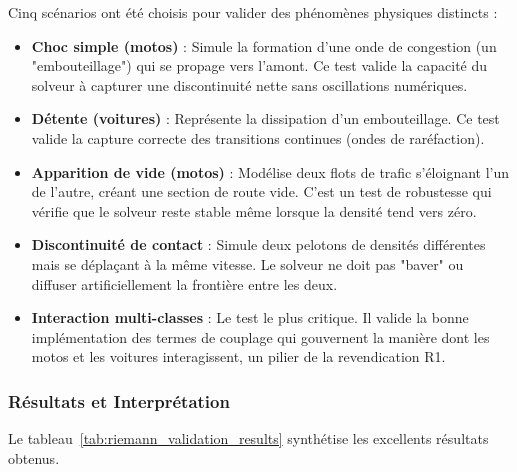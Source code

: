 Cinq scénarios ont été choisis pour valider des phénomènes physiques distincts :
\begin{itemize}
    \item \textbf{Choc simple (motos)} : Simule la formation d'une onde de congestion (un "embouteillage") qui se propage vers l'amont. Ce test valide la capacité du solveur à capturer une discontinuité nette sans oscillations numériques.
    \item \textbf{Détente (voitures)} : Représente la dissipation d'un embouteillage. Ce test valide la capture correcte des transitions continues (ondes de raréfaction).
    \item \textbf{Apparition de vide (motos)} : Modélise deux flots de trafic s'éloignant l'un de l'autre, créant une section de route vide. C'est un test de robustesse qui vérifie que le solveur reste stable même lorsque la densité tend vers zéro.
    \item \textbf{Discontinuité de contact} : Simule deux pelotons de densités différentes mais se déplaçant à la même vitesse. Le solveur ne doit pas "baver" ou diffuser artificiellement la frontière entre les deux.
    \item \textbf{Interaction multi-classes} : Le test le plus critique. Il valide la bonne implémentation des termes de couplage qui gouvernent la manière dont les motos et les voitures interagissent, un pilier de la revendication R1.
\end{itemize}

\subsubsection{Résultats et Interprétation}

Le tableau~\ref{tab:riemann_validation_results} synthétise les excellents résultats obtenus.

